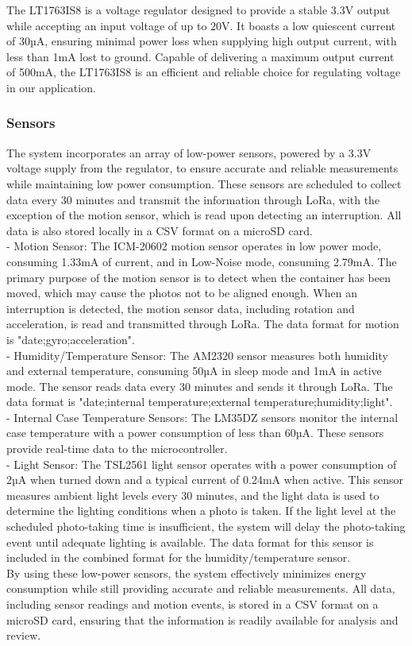 The LT1763IS8 is a voltage regulator designed to provide a stable 3.3V output while accepting an input voltage of up to 20V. It boasts a low quiescent current of 30µA, ensuring minimal power loss when supplying high output current, with less than 1mA lost to ground. Capable of delivering a maximum output current of 500mA, the LT1763IS8 is an efficient and reliable choice for regulating voltage in our application.

\newpage
\subsubsection{Sensors}
The system incorporates an array of low-power sensors, powered by a 3.3V voltage supply from the regulator, to ensure accurate and reliable measurements while maintaining low power consumption. These sensors are scheduled to collect data every 30 minutes and transmit the information through LoRa, with the exception of the motion sensor, which is read upon detecting an interruption. All data is also stored locally in a CSV format on a microSD card.\\
-	Motion Sensor: The ICM-20602 motion sensor operates in low power mode, consuming 1.33mA of current, and in Low-Noise mode, consuming 2.79mA. The primary purpose of the motion sensor is to detect when the container has been moved, which may cause the photos not to be aligned enough. When an interruption is detected, the motion sensor data, including rotation and acceleration, is read and transmitted through LoRa. The data format for motion is "date;gyro;acceleration".\\
-	Humidity/Temperature Sensor: The AM2320 sensor measures both humidity and external temperature, consuming 50µA in sleep mode and 1mA in active mode. The sensor reads data every 30 minutes and sends it through LoRa. The data format is "date;internal temperature;external temperature;humidity;light".\\
-	Internal Case Temperature Sensors: The LM35DZ sensors monitor the internal case temperature with a power consumption of less than 60µA. These sensors provide real-time data to the microcontroller.\\
-	Light Sensor: The TSL2561 light sensor operates with a power consumption of 2µA when turned down and a typical current of 0.24mA when active. This sensor measures ambient light levels every 30 minutes, and the light data is used to determine the lighting conditions when a photo is taken. If the light level at the scheduled photo-taking time is insufficient, the system will delay the photo-taking event until adequate lighting is available. The data format for this sensor is included in the combined format for the humidity/temperature sensor.\\
By using these low-power sensors, the system effectively minimizes energy consumption while still providing accurate and reliable measurements. All data, including sensor readings and motion events, is stored in a CSV format on a microSD card, ensuring that the information is readily available for analysis and review.

